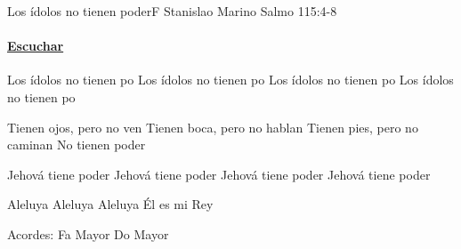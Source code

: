 \documentclass[12pt, spanish]{book}
\begin{document}
    \begin{song}{Los ídolos no tienen poder}{F}
        {} %
        {Stanislao Marino}
        {Salmo 115:4-8} %
        {}
        \ifChordBk
        \paragraph{\mbox{}\hfill\protect\href{https://open.spotify.com/intl-es/track/4WaPyueee7G9QhxQhEWhfa}{Escuchar}\mbox{}\hfill}
        \fi

        \begin{SBOpGroup}
            Los ídolos no tienen po
            Los ídolos no tienen po
            Los ídolos no tienen po
            Los ídolos no tienen po
        \end{SBOpGroup}

        \begin{SBChorus}
            Tienen ojos, pero no ven
            Tienen boca, pero no hablan
            Tienen pies, pero no caminan
            No tienen poder
        \end{SBChorus}

        \begin{SBOpGroup}
            Jehová tiene poder
            Jehová tiene poder
            Jehová tiene poder
            Jehová tiene poder
        \end{SBOpGroup}

        \begin{SBOpGroup}
            Aleluya
            Aleluya
            Aleluya
            Él es mi Rey
        \end{SBOpGroup}

        \ifChordBk
        \begin{SBOpGroup}
            Acordes:\break
            \upchord{\F}\qquad Fa Mayor \hfill
            \upchord{\C}\qquad Do Mayor \hfill\null\break
        \end{SBOpGroup}
        \fi
    \end{song}
\end{document}
